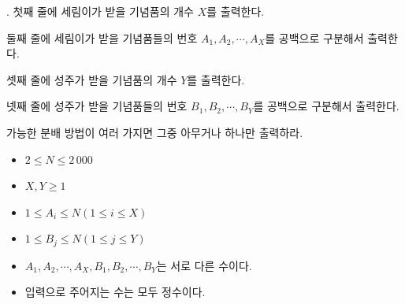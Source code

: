 \begin{problem}{\probno{}. \probtitle{}}
첫째 줄에 세림이가 받을 기념품의 개수 $X$를 출력한다.

둘째 줄에 세림이가 받을 기념품들의 번호 $A_1, A_2, \cdots, A_X$를 공백으로 구분해서 출력한다.

셋째 줄에 성주가 받을 기념품의 개수 $Y$를 출력한다.

넷째 줄에 성주가 받을 기념품들의 번호 $B_1, B_2, \cdots, B_Y$를 공백으로 구분해서 출력한다.

가능한 분배 방법이 여러 가지면 그중 아무거나 하나만 출력하라.

\pagebreak

\Constraints

\begin{itemize}[topsep=0pt,noitemsep]
    \item $2 \leq N \leq 2\,000$
    \item $X, Y \ge 1$
    \item $1 \le A_i \le N (1 \le i \le X)$
    \item $1 \le B_j \le N (1 \le j \le Y)$
    \item $A_1, A_2, \cdots, A_X, B_1, B_2, \cdots, B_Y$는 서로 다른 수이다.
    \item 입력으로 주어지는 수는 모두 정수이다.
\end{itemize}

\Example

\begin{example}
\end{example}

\end{problem}